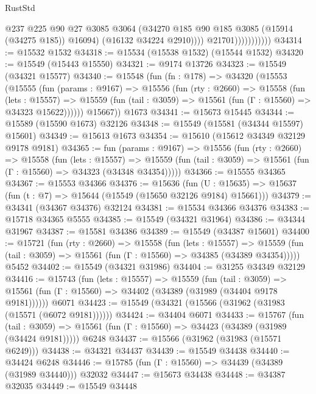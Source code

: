 \begin{lexlean}{RustStd}
\begin{coremodule}
                                @237
                                @225
                                @90
                                @27
                                @3085
                                @3064
                                (@34270 @185 @90 @185 @3085 (@15914 (@34275 @185)) @16094)
                                (@16132 @34224 @2910))))
                          @21701)))))))))))
@34314 := @15532 @1532
@34318 := @15534 (@15538 @1532) (@15544 @1532)
@34320 := @15549 (@15443 @15550)
@34321 := @9174 @13726
@34323 := @15549 (@34321 @15577)
@34340 := @15548
    (fun (fn : @178) =>
    @34320
      (@15553
        (@15555
          (fun (params : @9167) =>
          @15556
            (fun (rty : @2660) =>
            @15558
              (fun (lets : @15557) =>
              @15559 (fun (tail : @3059) => @15561 (fun (Γ : @15560) => @34323 @15622))))))
        @15667))
    @1673
@34341 := @15673 @15445
@34344 := @15589 (@15590 @1673) @32126
@34348 := @15549 (@15581 (@34344 @15597) @15601)
@34349 := @15613 @1673
@34354 := @15610 (@15612 @34349 @32129 @9178 @9181)
@34365 := fun (params : @9167) =>
  @15556
    (fun (rty : @2660) =>
    @15558
      (fun (lets : @15557) =>
      @15559 (fun (tail : @3059) => @15561 (fun (Γ : @15560) => @34323 (@34348 @34354)))))
@34366 := @15555 @34365
@34367 := @15553 @34366
@34376 := @15636
    (fun (U : @15635) => @15637 (fun (t : @7) => @15644 (@15549 (@15650 @32126 @9184) @15661)))
@34379 := @34341 (@34367 @34376) @32124
@34381 := @15534 @34366 @34376
@34383 := @15718 @34365 @5555
@34385 := @15549 (@34321 @31964)
@34386 := @34344 @31967
@34387 := @15581 @34386
@34389 := @15549 (@34387 @15601)
@34400 := @15721
    (fun (rty : @2660) =>
    @15558
      (fun (lets : @15557) =>
      @15559 (fun (tail : @3059) => @15561 (fun (Γ : @15560) => @34385 (@34389 @34354)))))
    @5452
@34402 := @15549 (@34321 @31986)
@34404 := @31255 @34349 @32129
@34416 := @15743
    (fun (lets : @15557) =>
    @15559
      (fun (tail : @3059) =>
      @15561 (fun (Γ : @15560) => @34402 (@34389 (@31989 (@34404 @9178 @9181))))))
    @6071
@34423 := @15549 (@34321 (@15566 (@31962 (@31983 (@15571 (@6072 @9181))))))
@34424 := @34404 @6071
@34433 := @15767
    (fun (tail : @3059) => @15561 (fun (Γ : @15560) => @34423 (@34389 (@31989 (@34424 @9181)))))
    @6248
@34437 := @15566 (@31962 (@31983 (@15571 @6249)))
@34438 := @34321 @34437
@34439 := @15549 @34438
@34440 := @34424 @6248
@34446 := @15785 (fun (Γ : @15560) => @34439 (@34389 (@31989 @34440))) @32032
@34447 := @15673 @34438
@34448 := @34387 @32035
@34449 := @15549 @34448

\end{coremodule}
\end{lexlean}
